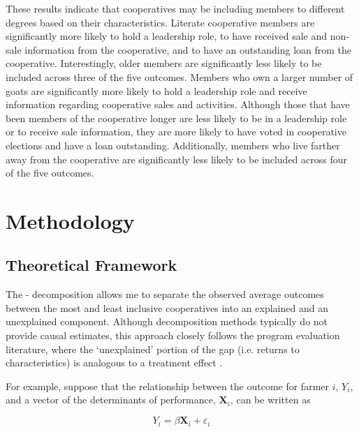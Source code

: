 \documentclass[11pt]{article}
\begin{document}
These results indicate that cooperatives may be including members to different degrees based on their characteristics. Literate cooperative members are significantly more likely to hold a leadership role, to have received sale and non-sale information from the cooperative, and to have an outstanding loan from the cooperative. Interestingly, older members are significantly less likely to be included across three of the five outcomes. Members who own a larger number of goats are significantly more likely to hold a leadership role and receive information regarding cooperative sales and activities. Although those that have been members of the cooperative longer are less likely to be in a leadership role or to receive sale information, they are more likely to have voted in cooperative elections and have a loan outstanding. Additionally, members who live farther away from the cooperative are significantly less likely to be included across four of the five outcomes.  

\section{Methodology} \label{sec:E1_emp}

\subsection{Theoretical Framework} \label{sec:E1_theory}

The \citet{oaxaca_male-female_1973}-\citet{blinder_wage_1973} decomposition allows me to separate the observed average outcomes between the most and least inclusive cooperatives into an explained and an unexplained component. Although decomposition methods typically do not provide causal estimates, this approach closely follows the program evaluation literature, where the `unexplained' portion of the gap (i.e. returns to characteristics) is analogous to a treatment effect \citep{n_fortin_notitle_2011}.

For example, suppose that the relationship between the outcome for farmer $i$, $Y_i$, and a vector of the determinants of performance, $\mathbf{X}_i$, can be written as

\begin{equation} \label{eq:E1_1}
    Y_i = \beta \mathbf{X}_i + \varepsilon_i
\end{equation}  
\end{document}
